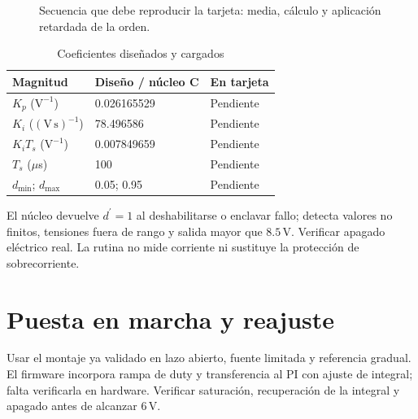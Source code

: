 \documentclass[conference,letterpaper]{IEEEtran}
\begin{document}
\begin{figure}[H]\centering{}\caption{Secuencia que debe reproducir la tarjeta: media, cálculo y aplicación retardada de la orden.}\label{fig:timing}\end{figure}
\begin{table}[H]\caption{Coeficientes diseñados y cargados}\label{tab:coefficients}\centering\footnotesize\setlength{\tabcolsep}{2pt}\renewcommand{\arraystretch}{1.18}\begin{tabularx}{\columnwidth}{LYY}\toprule
Magnitud & Diseño / núcleo C & En tarjeta\\\midrule
$K_p$ ($\mathrm{V}^{-1}$) & 0.026165529 & Pendiente\\
$K_i$ ($(\mathrm{V\,s})^{-1}$) & 78.496586 & Pendiente\\
$K_iT_s$ ($\mathrm{V}^{-1}$) & 0.007849659 & Pendiente\\
$T_s$ ($\mu$s) & 100 & Pendiente\\
$d_{\min}$; $d_{\max}$ & 0.05; 0.95 & Pendiente\\\bottomrule\end{tabularx}\end{table}
El núcleo devuelve $d^{\prime}=1$ al deshabilitarse o enclavar fallo; detecta valores no finitos, tensiones fuera de rango y salida mayor que $8.5\,\mathrm{V}$. Verificar apagado eléctrico real. La rutina no mide corriente ni sustituye la protección de sobrecorriente.

\section{Puesta en marcha y reajuste}
Usar el montaje ya validado en lazo abierto, fuente limitada y referencia gradual. El firmware incorpora rampa de duty y transferencia al PI con ajuste de integral; falta verificarla en hardware. Verificar saturación, recuperación de la integral y apagado antes de alcanzar $6\,\mathrm{V}$.
\end{document}
